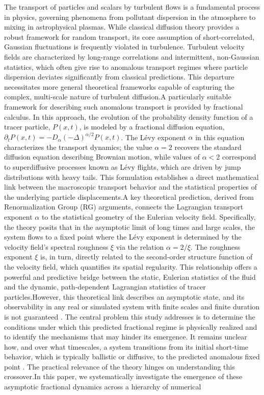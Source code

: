 \documentclass[]{article}
\begin{document}
The transport of particles and scalars by turbulent flows is a fundamental process in physics, governing phenomena from pollutant dispersion in the atmosphere to mixing in astrophysical plasmas. While classical diffusion theory provides a robust framework for random transport, its core assumption of short-correlated, Gaussian fluctuations is frequently violated in turbulence. Turbulent velocity fields are characterized by long-range correlations and intermittent, non-Gaussian statistics, which often give rise to anomalous transport regimes where particle dispersion deviates significantly from classical predictions. This departure necessitates more general theoretical frameworks capable of capturing the complex, multi-scale nature of turbulent diffusion.A particularly suitable framework for describing such anomalous transport is provided by fractional calculus. In this approach, the evolution of the probability density function of a tracer particle, $P(x,t)$, is modeled by a fractional diffusion equation, $\partial_t P(x,t) = -D_\alpha(-\Delta)^{\alpha/2} P(x,t)$. The Lévy exponent $\alpha$ in this equation characterizes the transport dynamics; the value $\alpha=2$ recovers the standard diffusion equation describing Brownian motion, while values of $\alpha < 2$ correspond to superdiffusive processes known as Lévy flights, which are driven by jump distributions with heavy tails. This formulation establishes a direct mathematical link between the macroscopic transport behavior and the statistical properties of the underlying particle displacements.A key theoretical prediction, derived from Renormalization Group (RG) arguments, connects the Lagrangian transport exponent $\alpha$ to the statistical geometry of the Eulerian velocity field. Specifically, the theory posits that in the asymptotic limit of long times and large scales, the system flows to a fixed point where the Lévy exponent is determined by the velocity field's spectral roughness $\xi$ via the relation $\alpha = 2/\xi$. The roughness exponent $\xi$ is, in turn, directly related to the second-order structure function of the velocity field, which quantifies its spatial regularity. This relationship offers a powerful and predictive bridge between the static, Eulerian statistics of the fluid and the dynamic, path-dependent Lagrangian statistics of tracer particles.However, this theoretical link describes an asymptotic state, and its observability in any real or simulated system with finite scales and finite duration is not guaranteed  \citep{onizawa2026finitetimeobservabilityoscillatoryinstabilities}. The central problem this study addresses is to determine the conditions under which this predicted fractional regime is physically realized and to identify the mechanisms that may hinder its emergence. It remains unclear how, and over what timescales, a system transitions from its initial short-time behavior, which is typically ballistic or diffusive, to the predicted anomalous fixed point  \citep{onizawa2026finitetimeobservabilityoscillatoryinstabilities}. The practical relevance of the theory hinges on understanding this crossover.In this paper, we systematically investigate the emergence of these asymptotic fractional dynamics  \citep{edelman2022cyclesasymptoticallystablechaotic} across a hierarchy of numerical 
\end{document}
